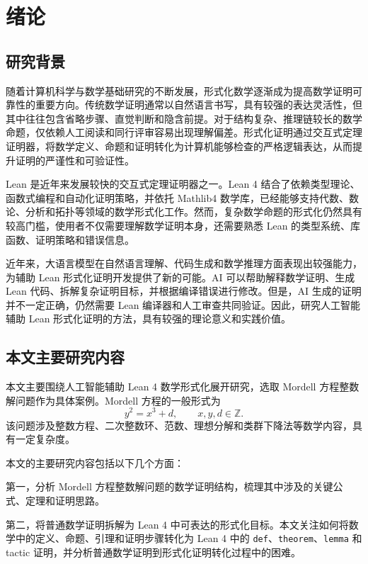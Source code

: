 \newpage
{}
\section{绪论}

\subsection{研究背景}

随着计算机科学与数学基础研究的不断发展，形式化数学逐渐成为提高数学证明可靠性的重要方向。传统数学证明通常以自然语言书写，具有较强的表达灵活性，但其中往往包含省略步骤、直觉判断和隐含前提。对于结构复杂、推理链较长的数学命题，仅依赖人工阅读和同行评审容易出现理解偏差。形式化证明通过交互式定理证明器，将数学定义、命题和证明转化为计算机能够检查的严格逻辑表达，从而提升证明的严谨性和可验证性。

Lean 是近年来发展较快的交互式定理证明器之一。Lean 4 结合了依赖类型理论、函数式编程和自动化证明策略，并依托 Mathlib4 数学库，已经能够支持代数、数论、分析和拓扑等领域的数学形式化工作。然而，复杂数学命题的形式化仍然具有较高门槛，使用者不仅需要理解数学证明本身，还需要熟悉 Lean 的类型系统、库函数、证明策略和错误信息。

近年来，大语言模型在自然语言理解、代码生成和数学推理方面表现出较强能力，为辅助 Lean 形式化证明开发提供了新的可能。AI 可以帮助解释数学证明、生成 Lean 代码、拆解复杂证明目标，并根据编译错误进行修改。但是，AI 生成的证明并不一定正确，仍然需要 Lean 编译器和人工审查共同验证。因此，研究人工智能辅助 Lean 形式化证明的方法，具有较强的理论意义和实践价值。

\subsection{本文主要研究内容}

本文主要围绕人工智能辅助 Lean 4 数学形式化展开研究，选取 Mordell 方程整数解问题作为具体案例。Mordell 方程的一般形式为
\[
y^2=x^3+d,\qquad x,y,d\in\mathbb{Z}.
\]
该问题涉及整数方程、二次整数环、范数、理想分解和类群下降法等数学内容，具有一定复杂度。

本文的主要研究内容包括以下几个方面：

第一，分析 Mordell 方程整数解问题的数学证明结构，梳理其中涉及的关键公式、定理和证明思路。

第二，将普通数学证明拆解为 Lean 4 中可表达的形式化目标。本文关注如何将数学中的定义、命题、引理和证明步骤转化为 Lean 4 中的 \texttt{def}、\texttt{theorem}、\texttt{lemma} 和 tactic 证明，并分析普通数学证明到形式化证明转化过程中的困难。

